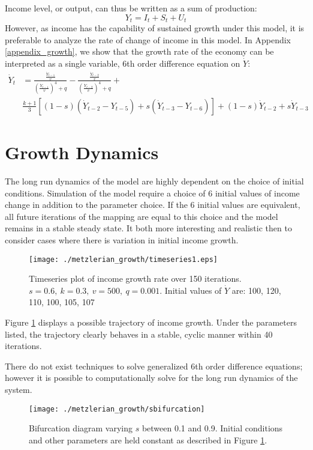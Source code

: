 Income level, or output, can thus be written as a sum of production:
\begin{equation}\label{eq:Income}
    Y_t=I_t+S_t+U_t
\end{equation}
However, as income has the capability of sustained growth under this model, it is preferable to analyze the rate of change of income in this model. In Appendix \ref{appendix_growth}, we show that the growth rate of the economy can be interpreted as a single variable, 6th order difference equation on $\dot Y$:
\begin{equation}
    \begin{split}
        \dot Y_{t}& = \frac{\frac{\dot Y_{t-1}}{v}}{\left(\frac{\dot Y_{t-1}}{v}\right)^4+q}-\frac{\frac{\dot Y_{t-2}}{v}}{\left(\frac{\dot Y_{t-2}}{v}\right)^4+q} + \\
        & \frac{k+1}{3}\left[(1-s)(\dot Y_{t-2}-Y_{t-5})+s(\dot Y_{t-3}-Y_{t-6})\right]+(1-s)\dot Y_{t-2}+s\dot Y_{t-3}
    \end{split}
    \end{equation}

\section{Growth Dynamics}
The long run dynamics of the model are highly dependent on the choice of initial conditions. Simulation of the model require a choice of 6 initial values of income change in addition to the parameter choice. If the 6 initial values are equivalent, all future iterations of the mapping are equal to this choice and the model remains in a stable steady state. It both more interesting and realistic then to consider cases where there is variation in initial income growth.
\begin{figure}[ht]
    \centering
    \texttt{[image: ./metzlerian\_growth/timeseries1.eps]}
    \caption{Timeseries plot of income growth rate over 150 iterations. $s=0.6,\ k=0.3,\ v=500,\ q=0.001$. Initial values of $\dot Y$ are: 100, 120, 110, 100, 105, 107}
    \label{metzlerian_growth-timeseries1}
\end{figure}
Figure \ref{metzlerian_growth-timeseries1} displays a possible trajectory of income growth. Under the parameters listed, the trajectory clearly behaves in a stable, cyclic manner within 40 iterations. 

There do not exist techniques to solve generalized 6th order difference equations; however it is possible to computationally solve for the long run dynamics of the system.
\begin{figure}
    \centering
    \texttt{[image: ./metzlerian\_growth/sbifurcation]}
    \caption{Bifurcation diagram varying $s$ between 0.1 and 0.9. Initial conditions and other parameters are held constant as described in Figure \ref{metzlerian_growth-timeseries1}.}
    \label{metzlerian_growth-sbifurcation}
\end{figure}

